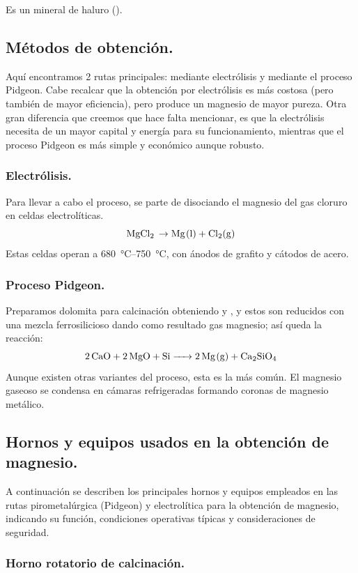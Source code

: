 \documentclass[12pt,a4paper]{article}
\begin{document}
Es un mineral de haluro ().

\subsection{Métodos de obtención.}

Aquí encontramos 2 rutas principales: mediante electrólisis y mediante el proceso Pidgeon. Cabe recalcar que la obtención por electrólisis es más costosa (pero también de mayor eficiencia), pero produce un magnesio de mayor pureza. Otra gran diferencia que creemos que hace falta mencionar, es que la electrólisis necesita de un mayor capital y energía para su funcionamiento, mientras que el proceso Pidgeon es más simple y económico aunque robusto.

\subsubsection{Electrólisis.}

Para llevar a cabo el proceso, se parte de  disociando el magnesio del gas cloruro en celdas electrolíticas.
\[ \ce{MgCl2 \rightarrow Mg(l) + Cl2(g)}\]
Estas celdas operan a \SIrange[range-phrase = { - }, range-units=single]{680}{750}{\celsius}, con ánodos de grafito y cátodos de acero.

\subsubsection{Proceso Pidgeon.}

Preparamos dolomita para calcinación obteniendo  y , y estos son reducidos con una mezcla ferrosilicioso dando como resultado gas magnesio; así queda la reacción:
\[ \ce{2CaO + 2MgO + Si -> 2Mg(g) + Ca2SiO4}\]
Aunque existen otras variantes del proceso, esta es la más común. El magnesio gaseoso se condensa en cámaras refrigeradas formando coronas de magnesio metálico.

\subsection{Hornos y equipos usados en la obtención de magnesio.}
A continuación se describen los principales hornos y equipos empleados en las rutas pirometalúrgica (Pidgeon) y electrolítica para la obtención de magnesio, indicando su función, condiciones operativas típicas y consideraciones de seguridad.

\subsubsection{Horno rotatorio de calcinación.}
\end{document}

